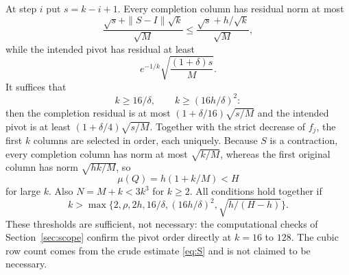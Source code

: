 \documentclass[11pt,a4paper]{article}
\theoremstyle{definition}
\numberwithin{equation}{section}
\begin{document}
At step $i$ put $s=k-i+1$. Every completion column has residual norm at most
\begin{equation}\label{eq:fill-res}
 \frac{\sqrt s+\|S-I\|\sqrt k}{\sqrt M}\le\frac{\sqrt s+h/\sqrt k}{\sqrt M},
\end{equation}
while the intended pivot has residual at least
\begin{equation}\label{eq:pivot-res}
 e^{-1/k}\sqrt{\frac{(1+\delta)s}M}.
\end{equation}
It suffices that
\begin{equation}\label{eq:k-cond}
 k\ge16/\delta,\qquad k\ge(16h/\delta)^2:
\end{equation}
then the completion residual is at most $(1+\delta/16)\sqrt{s/M}$ and the intended pivot is at least
$(1+\delta/4)\sqrt{s/M}$. Together with the strict decrease of $f_j$, the first $k$ columns are selected in order,
each uniquely. Because $S$ is a contraction, every completion column has norm at most $\sqrt{k/M}$, whereas the first
original column has norm $\sqrt{hk/M}$, so
\begin{equation}\label{eq:mu-lower}
 \mu(Q)=h(1+k/M)<H
\end{equation}
for large $k$. Also $N=M+k<3k^3$ for $k\ge2$. All conditions hold together if
\begin{equation}\label{eq:k-all}
 k>\max\bigl\{2,\rho,2h,16/\delta,(16h/\delta)^2,\sqrt{h/(H-h)}\bigr\}.
\end{equation}
These thresholds are sufficient, not necessary: the computational checks of Section~\ref{sec:scope} confirm the
pivot order directly at $k=16$ to $128$. The cubic row count comes from the crude estimate \eqref{eq:S} and is not
claimed to be necessary.
\end{document}
